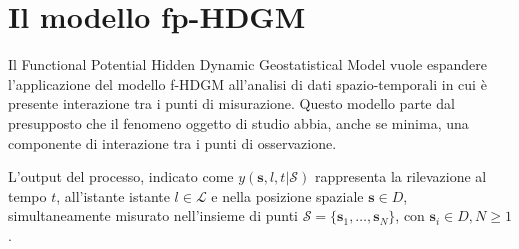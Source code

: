 \section[Il modello fp-HDGM]{Il modello fp-HDGM}
Il Functional Potential Hidden Dynamic Geostatistical Model vuole espandere l'applicazione del modello f-HDGM all'analisi di dati spazio-temporali in cui è presente interazione tra i punti di misurazione. Questo modello parte dal presupposto che il fenomeno oggetto di studio abbia, anche se minima, una componente di interazione tra i punti di osservazione.
\par L'output del processo, indicato come $y(\mathbf{s}, l, t| \mathcal{S})$ rappresenta la rilevazione al tempo $t$, all'istante istante $l\in\mathcal{L}$ e nella posizione spaziale $\mathbf{s} \in D$, simultaneamente misurato nell'insieme di punti $\mathcal{S} = \{\mathbf{s}_1, \ldots, \mathbf{s}_N\}$, con $\mathbf{s}_i\in D, N \geq 1$.

